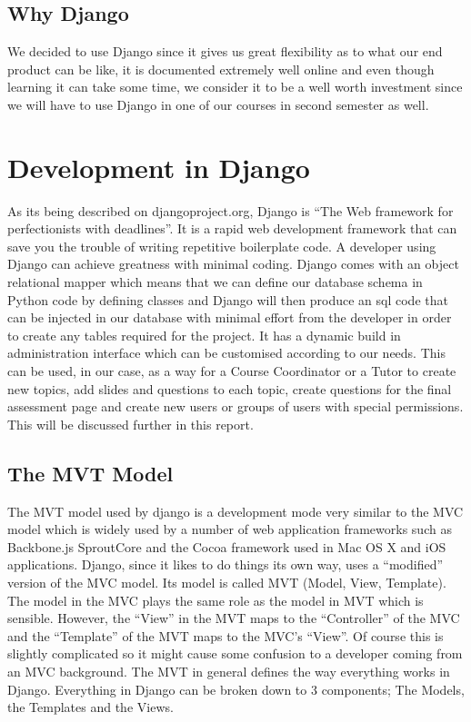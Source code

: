 \documentclass{l3proj}
\begin{document}
\subsection {Why Django}
We decided to use Django since it gives us great flexibility as to what our end product 
can be like, it is documented extremely well online and even though learning it can take 
some time, we consider it to be a well worth investment since we will have to use 
Django in one of our courses in second semester as well. 
\section{Development in Django}
As its being described on djangoproject.org, Django is ``The Web framework for 
perfectionists with deadlines''. It is a rapid web development framework that can save 
you the trouble of writing repetitive boilerplate code. A developer using Django can 
achieve greatness with minimal coding. Django comes with an object relational mapper 
which means that we can define our database schema in Python code by defining 
classes and Django will then produce an sql code that can be injected in our database 
with minimal effort from the developer in order to create any tables required for the 
project. It has a dynamic build in administration interface which can be customised 
according to our needs. This can be used, in our case, as a way for a Course 
Coordinator or a Tutor to create new topics, add slides and questions to each topic, 
create questions for the final assessment page and create new users or groups of users 
with special permissions. This will be discussed further in this report.
\subsection{The MVT Model}
The MVT model used by django is a development mode very similar to the MVC model which is widely used by a number of web application 
frameworks such as Backbone.js SproutCore and the Cocoa framework used in Mac OS X and iOS applications. Django, since it likes to do things its own way, uses a ``modified'' version of the MVC model. Its model is called MVT (Model, View, Template). The model in the MVC 
plays the same role as the model in MVT which is sensible. However, the ``View'' in the 
MVT maps to the ``Controller'' of the MVC and the ``Template'' of the MVT maps to the 
MVC's ``View''. Of course this is slightly complicated so it might cause some confusion to 
a developer coming from an MVC background. 
The MVT in general defines the way everything works in Django. Everything in Django 
can be broken down to 3 components; The Models, the Templates and the Views.
\end{document}
